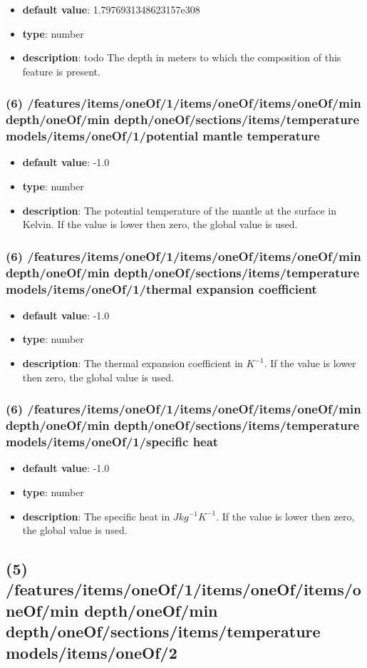 \begin{itemize}[leftmargin=6em]\item {\bf default value}: 1.7976931348623157e308
\item {\bf type}: number
\item {\bf description}: todo The depth in meters to which the composition of this feature is present.
\end{itemize}\subsubsection{(6) /features/items/oneOf/1/items/oneOf/items/oneOf/min depth/oneOf/min depth/oneOf/sections/items/temperature models/items/oneOf/1/potential mantle temperature}
\begin{itemize}[leftmargin=6em]\item {\bf default value}: -1.0
\item {\bf type}: number
\item {\bf description}: The potential temperature of the mantle at the surface in Kelvin. If the value is lower then zero, the global value is used.
\end{itemize}\subsubsection{(6) /features/items/oneOf/1/items/oneOf/items/oneOf/min depth/oneOf/min depth/oneOf/sections/items/temperature models/items/oneOf/1/thermal expansion coefficient}
\begin{itemize}[leftmargin=6em]\item {\bf default value}: -1.0
\item {\bf type}: number
\item {\bf description}: The thermal expansion coefficient in $K^{-1}$. If the value is lower then zero, the global value is used.
\end{itemize}\subsubsection{(6) /features/items/oneOf/1/items/oneOf/items/oneOf/min depth/oneOf/min depth/oneOf/sections/items/temperature models/items/oneOf/1/specific heat}
\begin{itemize}[leftmargin=6em]\item {\bf default value}: -1.0
\item {\bf type}: number
\item {\bf description}: The specific heat in $J kg^{-1} K^{-1}$. If the value is lower then zero, the global value is used.
\end{itemize}\subsection{(5) /features/items/oneOf/1/items/oneOf/items/oneOf/min depth/oneOf/min depth/oneOf/sections/items/temperature models/items/oneOf/2}
